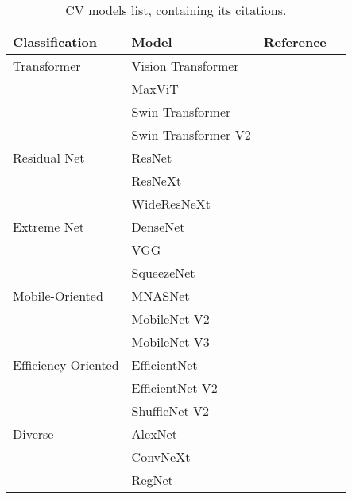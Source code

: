 
\begin{table}
	\centering
	\caption{\acrlong{CV} models list, containing its citations.}
	\begin{tabular}{llcc}
		\toprule	
		Classification 		& Model 		& Reference 			\\
 		\midrule	
		Transformer    		& Vision Transformer	& \cite{VisionTransformer}	\\
			   		& MaxViT		& \cite{MaxViT}			\\
			   		& Swin Transformer	& \cite{SwinTransformer}	\\
			   		& Swin Transformer V2	& \cite{SwinTransformerV2}	\\
		Residual Net   		& ResNet		& \cite{ResNet}			\\
			 		& ResNeXt		& \cite{ResNeXt}		\\
			 		& WideResNeXt		& \cite{WideResNet}		\\
		Extreme Net	   	& DenseNet		& \cite{DenseNet}		\\
				 	& VGG			& \cite{VGG}			\\
					& SqueezeNet		& \cite{SqueezeNet}		\\
		Mobile-Oriented		& MNASNet		& \cite{MNASNet}		\\
					& MobileNet V2		& \cite{MobileNetV2}		\\
					& MobileNet V3		& \cite{MobileNetV3}		\\
		Efficiency-Oriented	& EfficientNet		& \cite{EfficientNet}		\\
					& EfficientNet V2	& \cite{EfficientNetV2}		\\
					& ShuffleNet V2		& \cite{ShuffleNetV2}		\\
		Diverse		  	& AlexNet		& \cite{AlexNet}		\\
					& ConvNeXt		& \cite{ConvNeXt}		\\
 					& RegNet		& \cite{RegNet}			\\
		\bottomrule
	\end{tabular}
	\label{tab:cv_list}
\end{table}
